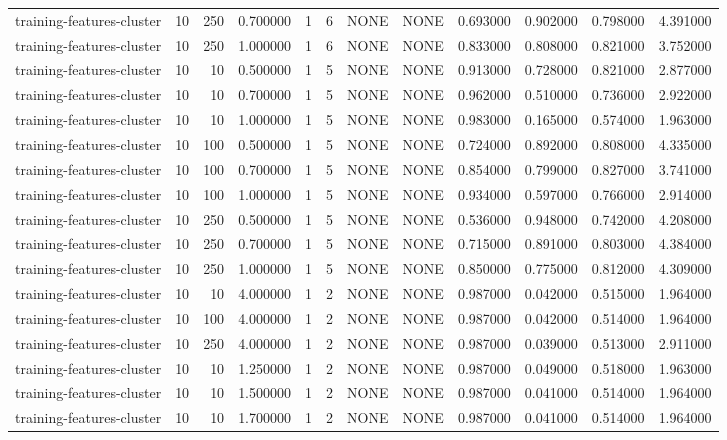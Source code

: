 \begin{tabular}{lrrrllllrrrr}
training-features-cluster & 10 & 250 & 0.700000 & 1 & 6 & NONE & NONE & 0.693000 & 0.902000 & 0.798000 & 4.391000 \\
training-features-cluster & 10 & 250 & 1.000000 & 1 & 6 & NONE & NONE & 0.833000 & 0.808000 & 0.821000 & 3.752000 \\
training-features-cluster & 10 & 10 & 0.500000 & 1 & 5 & NONE & NONE & 0.913000 & 0.728000 & 0.821000 & 2.877000 \\
training-features-cluster & 10 & 10 & 0.700000 & 1 & 5 & NONE & NONE & 0.962000 & 0.510000 & 0.736000 & 2.922000 \\
training-features-cluster & 10 & 10 & 1.000000 & 1 & 5 & NONE & NONE & 0.983000 & 0.165000 & 0.574000 & 1.963000 \\
training-features-cluster & 10 & 100 & 0.500000 & 1 & 5 & NONE & NONE & 0.724000 & 0.892000 & 0.808000 & 4.335000 \\
training-features-cluster & 10 & 100 & 0.700000 & 1 & 5 & NONE & NONE & 0.854000 & 0.799000 & 0.827000 & 3.741000 \\
training-features-cluster & 10 & 100 & 1.000000 & 1 & 5 & NONE & NONE & 0.934000 & 0.597000 & 0.766000 & 2.914000 \\
training-features-cluster & 10 & 250 & 0.500000 & 1 & 5 & NONE & NONE & 0.536000 & 0.948000 & 0.742000 & 4.208000 \\
training-features-cluster & 10 & 250 & 0.700000 & 1 & 5 & NONE & NONE & 0.715000 & 0.891000 & 0.803000 & 4.384000 \\
training-features-cluster & 10 & 250 & 1.000000 & 1 & 5 & NONE & NONE & 0.850000 & 0.775000 & 0.812000 & 4.309000 \\
training-features-cluster & 10 & 10 & 4.000000 & 1 & 2 & NONE & NONE & 0.987000 & 0.042000 & 0.515000 & 1.964000 \\
training-features-cluster & 10 & 100 & 4.000000 & 1 & 2 & NONE & NONE & 0.987000 & 0.042000 & 0.514000 & 1.964000 \\
training-features-cluster & 10 & 250 & 4.000000 & 1 & 2 & NONE & NONE & 0.987000 & 0.039000 & 0.513000 & 2.911000 \\
training-features-cluster & 10 & 10 & 1.250000 & 1 & 2 & NONE & NONE & 0.987000 & 0.049000 & 0.518000 & 1.963000 \\
training-features-cluster & 10 & 10 & 1.500000 & 1 & 2 & NONE & NONE & 0.987000 & 0.041000 & 0.514000 & 1.964000 \\
training-features-cluster & 10 & 10 & 1.700000 & 1 & 2 & NONE & NONE & 0.987000 & 0.041000 & 0.514000 & 1.964000 \\

\end{tabular}
